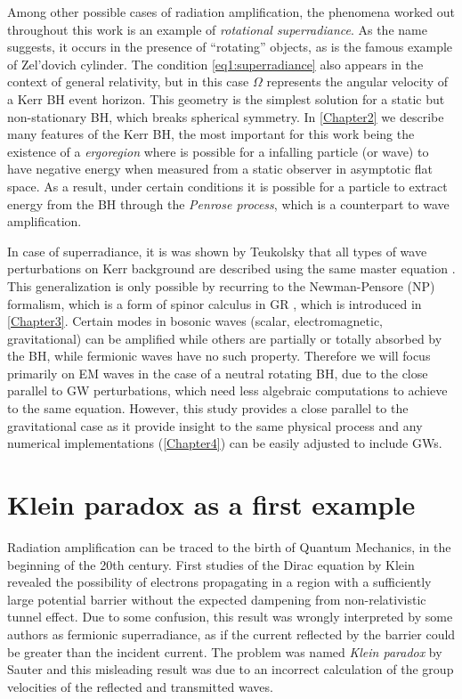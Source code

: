 Among other possible cases of radiation amplification, the phenomena worked out throughout this work is an example of \emph{rotational superradiance}. 
As the name suggests, it occurs in the presence of ``rotating'' objects, as is the famous example of Zel'dovich cylinder.
The condition \eqref{eq1:superradiance} also appears in the context of general relativity, but in this case $\Omega$ represents the angular velocity of a Kerr BH event horizon.
This geometry is the simplest solution for a static but non-stationary BH, which breaks spherical symmetry. 
In \cref{Chapter2} we describe many features of the Kerr BH, the most important for this work being the existence of a \emph{ergoregion} where is possible for a infalling particle (or wave) to have negative energy when measured from a static observer in asymptotic flat space.
As a result, under certain conditions it is possible for a particle to extract energy from the BH through the \emph{Penrose process}, which is a counterpart to wave amplification.

In case of superradiance, it is was shown by Teukolsky that all types of wave perturbations on Kerr background are described using the same master equation \cite{Teukolsky1972}.
This generalization is only possible by recurring to the Newman-Pensore (NP) formalism, which is a form of spinor calculus in GR \cite{Newman1962}, which is introduced in \cref{Chapter3}.
Certain modes in bosonic waves (scalar, electromagnetic, gravitational) can be amplified while others are partially or totally absorbed by the BH, while fermionic waves have no such property.
Therefore we will focus primarily on EM waves in the case of a neutral rotating BH, due to the close parallel to GW perturbations, which need less algebraic computations to achieve to the same equation.
However, this study provides a close parallel to the gravitational case as it provide insight to the same physical process and any numerical implementations (\cref{Chapter4}) can be easily adjusted to include GWs.




\section{Klein paradox as a first example}

Radiation amplification can be traced to the birth of Quantum Mechanics, in the beginning of the 20th century. 
First studies of the Dirac equation by Klein \cite{Klein1929} revealed the possibility of electrons propagating in a region with a sufficiently large potential barrier without the expected dampening from non-relativistic tunnel effect.
Due to some confusion, this result was wrongly interpreted by some authors as fermionic superradiance, as if the current reflected by the barrier could be greater than the incident current. 
The problem was named \emph{Klein paradox} by Sauter \cite{Sauter1931} and this misleading result was due to an incorrect calculation of the group velocities of the reflected and transmitted waves. 

